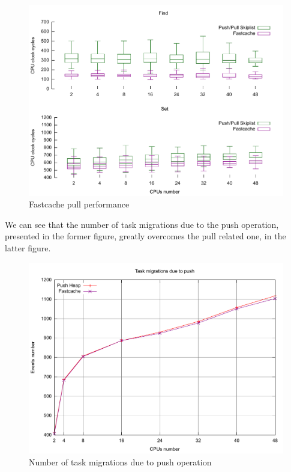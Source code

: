 \begin{figure}[htbp]
    \includegraphics[width=\columnwidth]{images/fastcache_pull}
    \caption{Fastcache pull performance}
    \label{fig:fastcache_pull}
\end{figure}

We can see that the number of task migrations 
due to the push operation, presented in the former figure, greatly overcomes 
the pull related one, in the latter figure.

\begin{figure}[htbp]
    \includegraphics[width=\columnwidth]{images/fastcache_pushed_away}
    \caption{Number of task migrations due to push operation}
    \label{fig:fastcache_pushed_away}
\end{figure}

